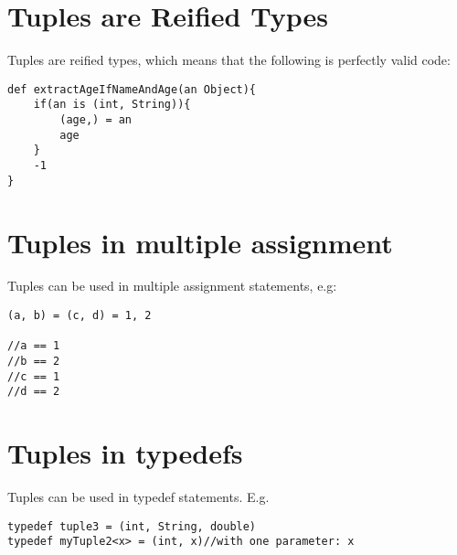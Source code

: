 \documentclass[conc-doc]{subfiles}
\begin{document}
\section{Tuples are Reified Types}
Tuples are reified types, which means that the following is perfectly valid code:
\begin{lstlisting}
def extractAgeIfNameAndAge(an Object){
	if(an is (int, String)){
		(age,) = an
		age
	}
	-1
}
\end{lstlisting}

\section{Tuples in multiple assignment}
Tuples can be used in multiple assignment statements, e.g:
\begin{lstlisting}
(a, b) = (c, d) = 1, 2

//a == 1
//b == 2
//c == 1
//d == 2
\end{lstlisting}

\section{Tuples in typedefs}
Tuples can be used in typedef statements. E.g.
\begin{lstlisting}
typedef tuple3 = (int, String, double)
typedef myTuple2<x> = (int, x)//with one parameter: x
\end{lstlisting}
\end{document}
